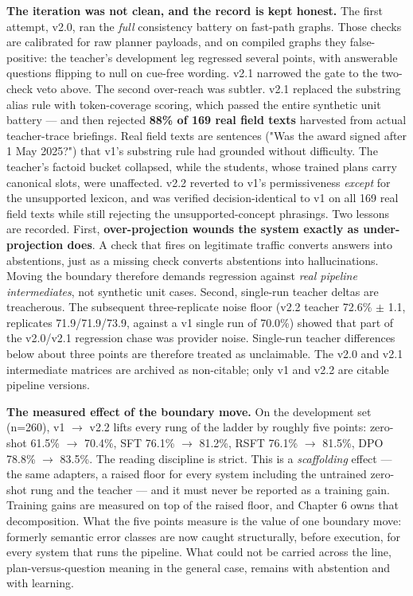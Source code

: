 \documentclass[10pt]{article} %
\begin{document}
\textbf{The iteration was not clean, and the record is kept honest.} The first attempt, v2.0, ran the \emph{full} consistency battery on fast-path graphs. Those checks are calibrated for raw planner payloads, and on compiled graphs they false-positive: the teacher's development leg regressed several points, with answerable questions flipping to null on cue-free wording. v2.1 narrowed the gate to the two-check veto above. The second over-reach was subtler. v2.1 replaced the substring alias rule with token-coverage scoring, which passed the entire synthetic unit battery --- and then rejected \textbf{88\% of 169 real field texts} harvested from actual teacher-trace briefings. Real field texts are sentences ("Was the award signed after 1 May 2025?") that v1's substring rule had grounded without difficulty. The teacher's factoid bucket collapsed, while the students, whose trained plans carry canonical slots, were unaffected. v2.2 reverted to v1's permissiveness \emph{except} for the unsupported lexicon, and was verified decision-identical to v1 on all 169 real field texts while still rejecting the unsupported-concept phrasings. Two lessons are recorded. First, \textbf{over-projection wounds the system exactly as under-projection does}. A check that fires on legitimate traffic converts answers into abstentions, just as a missing check converts abstentions into hallucinations. Moving the boundary therefore demands regression against \emph{real pipeline intermediates}, not synthetic unit cases. Second, single-run teacher deltas are treacherous. The subsequent three-replicate noise floor (v2.2 teacher 72.6\% $\pm$ 1.1, replicates 71.9/71.9/73.9, against a v1 single run of 70.0\%) showed that part of the v2.0/v2.1 regression chase was provider noise. Single-run teacher differences below about three points are therefore treated as unclaimable. The v2.0 and v2.1 intermediate matrices are archived as non-citable; only v1 and v2.2 are citable pipeline versions.

\textbf{The measured effect of the boundary move.} On the development set (n=260), v1 $\rightarrow$ v2.2 lifts every rung of the ladder by roughly five points: zero-shot 61.5\% $\rightarrow$ 70.4\%, SFT 76.1\% $\rightarrow$ 81.2\%, RSFT 76.1\% $\rightarrow$ 81.5\%, DPO 78.8\% $\rightarrow$ 83.5\%. The reading discipline is strict. This is a \emph{scaffolding} effect --- the same adapters, a raised floor for every system including the untrained zero-shot rung and the teacher --- and it must never be reported as a training gain. Training gains are measured on top of the raised floor, and Chapter 6 owns that decomposition. What the five points measure is the value of one boundary move: formerly semantic error classes are now caught structurally, before execution, for every system that runs the pipeline. What could not be carried across the line, plan-versus-question meaning in the general case, remains with abstention and with learning.
\end{document}
